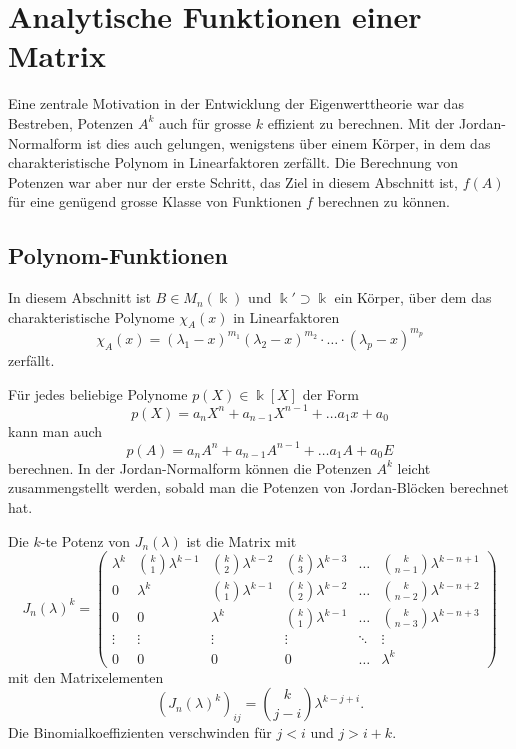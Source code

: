 %
%
%
\section{Analytische Funktionen einer Matrix
\label{buch:section:analytische-funktionen-einer-matrix}}
Eine zentrale Motivation in der Entwicklung der Eigenwerttheorie
war das Bestreben, Potenzen $A^k$ auch für grosse $k$ effizient
zu berechnen.
Mit der Jordan-Normalform ist dies auch gelungen, wenigstens über
einem Körper, in dem das charakteristische Polynom in Linearfaktoren
zerfällt.
Die Berechnung von Potenzen war aber nur der erste Schritt, das Ziel
in diesem Abschnitt ist, $f(A)$ für eine genügend grosse Klasse von
Funktionen $f$ berechnen zu können.

%
%
\subsection{Polynom-Funktionen
\label{buch:subsection:polynom-funktionen}}
In diesem Abschnitt ist $B\in M_n(\Bbbk)$ und $\Bbbk'\supset\Bbbk$ ein
Körper, über dem das charakteristische Polynome $\chi_A(x)$ in
Linearfaktoren
\[
\chi_A(x)
=
(\lambda_1-x)^{m_1}(\lambda_2-x)^{m_2}\cdot\ldots\cdot(\lambda_p-x)^{m_p}
\]
zerfällt.

Für jedes beliebige Polynome $p(X)\in\Bbbk[X]$ der Form
\[
p(X) = a_nX^n + a_{n-1}X^{n-1} + \dots a_1x + a_0
\]
kann man auch
\[
p(A) = a_nA^n + a_{n-1}A^{n-1} + \dots a_1A + a_0E
\]
berechnen.
In der Jordan-Normalform können die Potenzen $A^k$ leicht zusammengstellt
werden, sobald man die Potenzen von Jordan-Blöcken berechnet hat.

\begin{satz}
Die $k$-te Potenz von $J_n(\lambda)$ ist die Matrix mit
\begin{equation}
J_n(\lambda)^k
=
\begin{pmatrix}
\lambda^k
	& \binom{k}{1}\lambda^{k-1}
		& \binom{k}{2} \lambda^{k-2}
			& \binom{k}{3} \lambda^{k-3}
				& \dots
					&\binom{k}{n-1}\lambda^{k-n+1}
\\
0
	& \lambda^k
		& \binom{k}{1}\lambda^{k-1}
			& \binom{k}{2} \lambda^{k-2}
				& \dots
					&\binom{k}{n-2}\lambda^{k-n+2}
\\
0
	& 0
		& \lambda^k
			& \binom{k}{1}\lambda^{k-1}
				& \dots
					&\binom{k}{n-3}\lambda^{k-n+3}
\\
\vdots  &\vdots &\vdots &\vdots &\ddots & \vdots
\\
0	& 0	& 0	& 0	& \dots	& \lambda^k
\end{pmatrix}
\label{buch:eigenwerte:eqn:Jnkpotenz}
\end{equation}
mit den Matrixelementen
\[
(J_n(\lambda)^k)_{i\!j}
=
\binom{k}{j-i}\lambda^{k-j+i}.
\]
Die Binomialkoeffizienten verschwinden für $j<i$ und $j>i+k$.
\end{satz}

